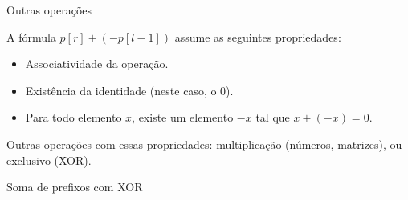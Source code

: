 \begin{frame}{Outras operações}

    A fórmula $p[r] + (-p[l-1])$ assume as seguintes propriedades:
    \begin{itemize} \pause
        \item[(i)] Associatividade da operação. \pause
        \item[(ii)] Existência da identidade (neste caso, o $0$). \pause
        \item[(iii)] Para todo elemento $x$, existe um elemento $-x$ tal que $x + (-x) = 0$.
    \end{itemize} \pause
    Outras operações com essas propriedades: multiplicação (números, matrizes), ou exclusivo (XOR). \pause

    \begin{block}{Soma de prefixos com XOR}
        \footnotesize
        \inputminted{cpp}{codigos/psumxor.cpp}    
    \end{block}

\end{frame}

